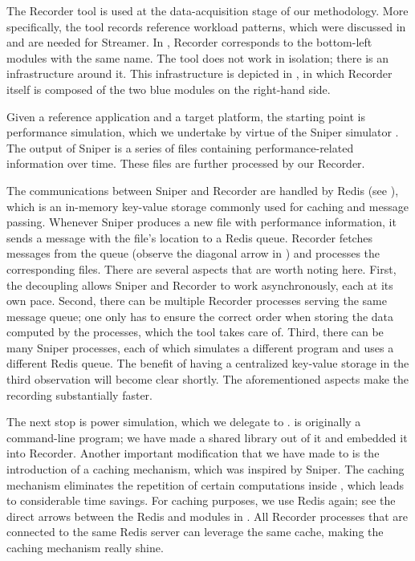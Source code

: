 
The Recorder tool is used at the data-acquisition stage of our methodology. More
specifically, the tool records reference workload patterns, which were discussed
in  and are needed for Streamer. In , Recorder
corresponds to the bottom-left modules with the same name. The tool does not
work in isolation; there is an infrastructure around it. This infrastructure is
depicted in , in which Recorder itself is composed of the two
blue modules on the right-hand side.

Given a reference application and a target platform, the starting point is
performance simulation, which we undertake by virtue of the Sniper simulator
\cite{carlson2011}. The output of Sniper is a series of files containing
performance-related information over time. These files are further processed by
our Recorder.

The communications between Sniper and Recorder are handled by Redis \cite{redis}
(see ), which is an in-memory key-value storage commonly used for
caching and message passing. Whenever Sniper produces a new file with
performance information, it sends a message with the file's location to a Redis
queue. Recorder fetches messages from the queue (observe the diagonal arrow in
) and processes the corresponding files. There are several
aspects that are worth noting here. First, the decoupling allows Sniper and
Recorder to work asynchronously, each at its own pace. Second, there can be
multiple Recorder processes serving the same message queue; one only has to
ensure the correct order when storing the data computed by the processes, which
the tool takes care of. Third, there can be many Sniper processes, each of which
simulates a different program and uses a different Redis queue. The benefit of
having a centralized key-value storage in the third observation will become
clear shortly. The aforementioned aspects make the recording substantially
faster.

The next stop is power simulation, which we delegate to 
\cite{li2009}.  is originally a command-line program; we have made a
shared library out of it and embedded it into Recorder. Another important
modification that we have made to  is the introduction of a caching
mechanism, which was inspired by Sniper. The caching mechanism eliminates the
repetition of certain computations inside , which leads to
considerable time savings. For caching purposes, we use Redis again; see the
direct arrows between the Redis and  modules in . All
Recorder processes that are connected to the same Redis server can leverage the
same cache, making the caching mechanism really shine.

